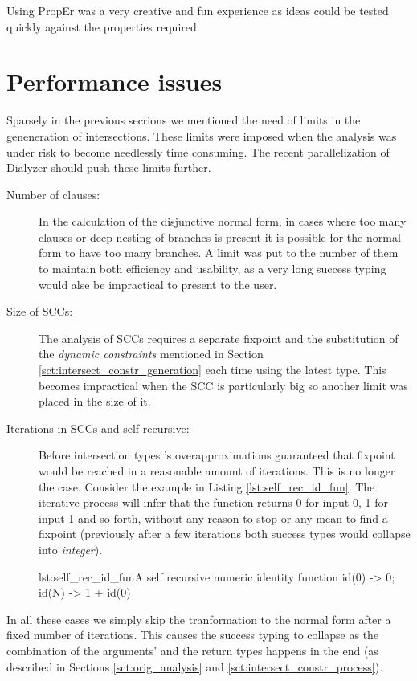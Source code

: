 Using PropEr was a very creative and fun experience as ideas could be
tested quickly against the properties required.

\section{Performance issues}

Sparsely in the previous secrions we mentioned the need of limits in
the geneneration of intersections. These limits were imposed when the
analysis was under risk to become needlessly time consuming. The
recent parallelization of Dialyzer \cite{Ypatia} should push these
limits further.
\begin{description}
\item[Number of clauses:] In the calculation of the disjunctive normal
  form, in cases where too many clauses or deep nesting of branches is
  present it is possible for the normal form to have too many
  branches. A limit was put to the number of them to maintain both
  efficiency and usability, as a very long success typing would alse
  be impractical to present to the user.
\item[Size of SCCs:] The analysis of SCCs requires a separate fixpoint
  and the substitution of the \emph{dynamic constraints} mentioned in
  Section \ref{sct:intersect_constr_generation} each time using the
  latest type. This becomes impractical when the SCC is particularly
  big so another limit was placed in the size of it.
\item[Iterations in SCCs and self-recursive:] Before intersection
  types \dr's overapproximations guaranteed that fixpoint would be
  reached in a reasonable amount of iterations. This is no longer the
  case. Consider the example in Listing \ref{lst:self_rec_id_fun}. The
  iterative process will infer that the function returns 0 for input
  0, 1 for input 1 and so forth, without any reason to stop or any
  mean to find a fixpoint (previously after a few iterations both
  success types would collapse into \emph{integer}).
  \begin{console}{lst:self_rec_id_fun}{A self recursive numeric identity function}
    id(0) -> 0; id(N) -> 1 + id(0)
  \end{console}
\end{description}

In all these cases we simply skip the tranformation to the normal form
after a fixed number of iterations. This causes the success typing to
collapse as the combination of the arguments' and the return types
happens in the end (as described in Sections \ref{sct:orig_analysis}
and \ref{sct:intersect_constr_process}).

